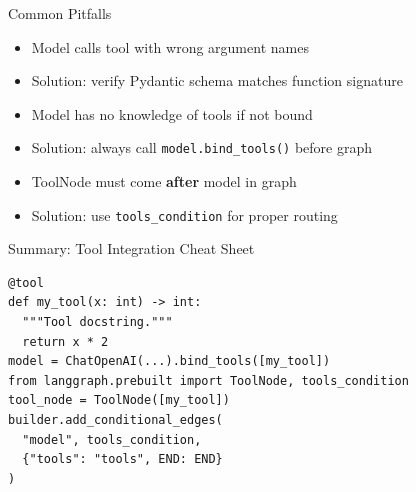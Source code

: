 \documentclass[aspectratio=169,11pt]{beamer}
\begin{document}
\begin{frame}{Common Pitfalls}
  \begin{warningbox}
    \setlength{\itemsep}{1pt}
    \begin{itemize}
      \item Model calls tool with wrong argument names
      \item Solution: verify Pydantic schema matches function signature
    \end{itemize}
  \end{warningbox}
  \vspace{0.1cm}
  \begin{warningbox}
    \setlength{\itemsep}{1pt}
    \begin{itemize}
      \item Model has no knowledge of tools if not bound
      \item Solution: always call \texttt{model.bind\_tools()} before graph
    \end{itemize}
  \end{warningbox}
  \vspace{0.1cm}
  \begin{warningbox}
    \setlength{\itemsep}{1pt}
    \begin{itemize}
      \item ToolNode must come \textbf{after} model in graph
      \item Solution: use \texttt{tools\_condition} for proper routing
    \end{itemize}
  \end{warningbox}
\end{frame}

\begin{frame}[fragile]{Summary: Tool Integration Cheat Sheet}
  \begin{codebox}
    \begin{lstlisting}
@tool
def my_tool(x: int) -> int:
  """Tool docstring."""
  return x * 2
model = ChatOpenAI(...).bind_tools([my_tool])
from langgraph.prebuilt import ToolNode, tools_condition
tool_node = ToolNode([my_tool])
builder.add_conditional_edges(
  "model", tools_condition,
  {"tools": "tools", END: END}
)
    \end{lstlisting}
  \end{codebox}
\end{frame}
\end{document}
